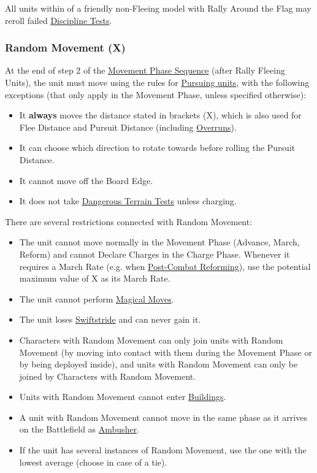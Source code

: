 All units within  of a friendly non-Fleeing model with Rally Around the Flag may reroll failed \hyperref[performing_a_discipline_test]{Discipline Tests}.


\subsubsection{Random Movement (X)}
\label{random_movement}

At the end of step 2 of the \hyperref[the_movement_phase_sequence]{Movement Phase Sequence} (after Rally Fleeing Units), the unit must move using the rules for \hyperref[pursuit_distance_and_pursuing_units]{Pursuing units}, with the following exceptions (that only apply in the Movement Phase, unless specified otherwise):

\begin{itemize}[label={-}]
\item It \textbf{always} moves the distance stated in brackets (X), which is also used for Flee Distance and Pursuit Distance (including \hyperref[overrun]{Overruns}).
\item It can choose which direction to rotate towards before rolling the Pursuit Distance.
\item It cannot move off the Board Edge.
\item It does not take \hyperref[dangerous_terrain]{Dangerous Terrain Tests} unless charging.
\end{itemize}


There are several restrictions connected with Random Movement:

\begin{itemize}[label={-}]
\item The unit cannot move normally in the Movement Phase (Advance, March, Reform) and cannot Declare Charges in the Charge Phase. Whenever it requires a March Rate (e.g. when \hyperref[post_combat_reform]{Post-Combat Reforming}), use the potential maximum value of X as its March Rate.
\item The unit cannot perform \hyperref[magical_move]{Magical Moves}.
\item The unit loses \hyperref[swiftstride]{Swiftstride} and can never gain it.
\item Characters with Random Movement can only join units with Random Movement (by moving into contact with them during the Movement Phase or by being deployed inside), and units with Random Movement can only be joined by Characters with Random Movement.
\item Units with Random Movement cannot enter \hyperref[buildings]{Buildings}.
\item A unit with Random Movement cannot move in the same phase as it arrives on the Battlefield as \hyperref[ambush]{Ambusher}.
\item If the unit has several instances of Random Movement, use the one with the lowest average (choose in case of a tie).
\end{itemize}

